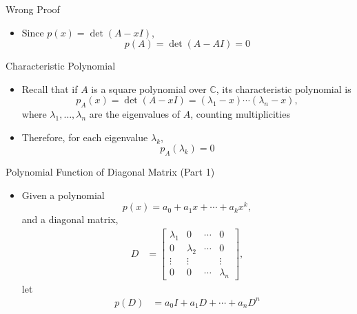 \documentclass[usenames,dvipsnames,10pt]{beamer}
\newcommand\C{\mathbb{C}}
\begin{document}
\begin{frame}
  {Wrong Proof}

  \begin{itemize}
  \item Since $p(x) = \det(A-xI)$,
    \[
      p(A) = \det(A-AI) = 0
    \]
  \end{itemize}
\end{frame}

\begin{frame}
  {Characteristic Polynomial}

  \begin{itemize}
  \item Recall that if $A$ is a square polynomial over $\C$, its characteristic polynomial is
    \[
      p_A(x) = \det(A-xI) = (\lambda_1-x)\cdots(\lambda_n-x),
    \]
    where $\lambda_1, \dots, \lambda_n$ are the eigenvalues of $A$, counting multiplicities
  \item Therefore, for each eigenvalue $\lambda_k$,
    \[
      p_A(\lambda_k) = 0
    \]
  \end{itemize}
\end{frame}

\begin{frame}
  {Polynomial Function of Diagonal Matrix (Part 1)}

  \begin{itemize}
  \item Given a polynomial
    \[
      p(x) = a_0 + a_1x + \cdots + a_kx^k,
    \]
    and a diagonal matrix,
    \begin{align*}
      D &=
          \begin{bmatrix}
            \lambda_1 & 0 &\cdots & 0\\
            0 &\lambda_2 & \cdots & 0\\
            \vdots & \vdots & & \vdots\\
            0 & 0 & \cdots & \lambda_n
          \end{bmatrix},
    \end{align*}
    let
    \begin{align*}
      p(D) &= a_0I + a_1D + \cdots + a_nD^n
    \end{align*}
  \end{itemize}
\end{frame}
\end{document}
